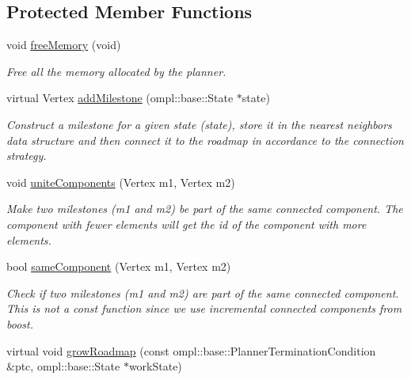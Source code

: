 \subsection*{\-Protected \-Member \-Functions}
\begin{DoxyCompactItemize}
\item 
\hypertarget{class_f_i_r_m_af6951ffec04529fd8da990978d7d8d19}{void \hyperlink{class_f_i_r_m_af6951ffec04529fd8da990978d7d8d19}{free\-Memory} (void)}\label{class_f_i_r_m_af6951ffec04529fd8da990978d7d8d19}

\begin{DoxyCompactList}\small\item\em \-Free all the memory allocated by the planner. \end{DoxyCompactList}\item 
\hypertarget{class_f_i_r_m_a6b72ace6d1708b25bf8c7f69331ae82b}{virtual \-Vertex \hyperlink{class_f_i_r_m_a6b72ace6d1708b25bf8c7f69331ae82b}{add\-Milestone} (ompl\-::base\-::\-State $\ast$state)}\label{class_f_i_r_m_a6b72ace6d1708b25bf8c7f69331ae82b}

\begin{DoxyCompactList}\small\item\em \-Construct a milestone for a given state ({\itshape state\/}), store it in the nearest neighbors data structure and then connect it to the roadmap in accordance to the connection strategy. \end{DoxyCompactList}\item 
\hypertarget{class_f_i_r_m_a34535f25e4f3fb645fb65d57e3faf01b}{void \hyperlink{class_f_i_r_m_a34535f25e4f3fb645fb65d57e3faf01b}{unite\-Components} (\-Vertex m1, \-Vertex m2)}\label{class_f_i_r_m_a34535f25e4f3fb645fb65d57e3faf01b}

\begin{DoxyCompactList}\small\item\em \-Make two milestones ({\itshape m1\/} and {\itshape m2\/}) be part of the same connected component. \-The component with fewer elements will get the id of the component with more elements. \end{DoxyCompactList}\item 
\hypertarget{class_f_i_r_m_a2045f113f0755ae8eeac2c35c7c08d41}{bool \hyperlink{class_f_i_r_m_a2045f113f0755ae8eeac2c35c7c08d41}{same\-Component} (\-Vertex m1, \-Vertex m2)}\label{class_f_i_r_m_a2045f113f0755ae8eeac2c35c7c08d41}

\begin{DoxyCompactList}\small\item\em \-Check if two milestones ({\itshape m1\/} and {\itshape m2\/}) are part of the same connected component. \-This is not a const function since we use incremental connected components from boost. \end{DoxyCompactList}\item 
\hypertarget{class_f_i_r_m_ae33b03b6c78466e4a47f7b6d9f59d7f8}{virtual void \hyperlink{class_f_i_r_m_ae33b03b6c78466e4a47f7b6d9f59d7f8}{grow\-Roadmap} (const ompl\-::base\-::\-Planner\-Termination\-Condition \&ptc, ompl\-::base\-::\-State $\ast$work\-State)}\label{class_f_i_r_m_ae33b03b6c78466e4a47f7b6d9f59d7f8}


\end{DoxyCompactItemize}
